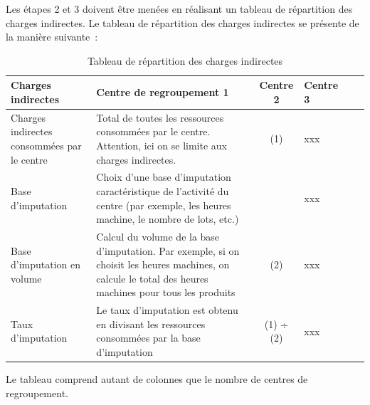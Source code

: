 \documentclass[oneside]{kaobook}
\begin{document}
Les étapes 2 et 3 doivent être menées en réalisant un tableau de répartition des charges indirectes. Le tableau de répartition des charges indirectes se présente de la manière suivante :
\clearpage
\begin{table}[htbp]
\caption{Tableau de répartition des charges indirectes}
\centering
\sidenotesize
\begin{tabular}{p{3cm} p{4cm} cp{2cm} cp{2cm}}
Charges indirectes & Centre de regroupement 1 & Centre 2 & Centre 3\\
\hline
Charges indirectes consommées par le centre & Total de toutes les ressources consommées par le centre. Attention, ici on se limite aux charges indirectes. & (1) & xxx\\
Base d'imputation & Choix d'une base d'imputation caractéristique de l'activité du centre (par exemple, les heures machine, le nombre de lots, etc.) &  & xxx\\
Base d'imputation en volume & Calcul du volume de la base d'imputation. Par exemple, si on choisit les heures machines, on calcule le total des heures machines pour tous les produits & (2) & xxx\\
Taux d'imputation & Le taux d'imputation est obtenu en divisant les ressources consommées par la base d'imputation & (1) ÷ (2) & xxx\\
\end{tabular}
\end{table}

Le tableau comprend autant de colonnes que le nombre de centres de regroupement.
\end{document}
